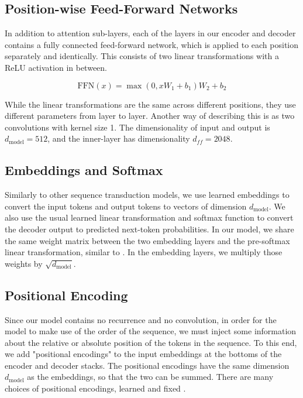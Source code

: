 \documentclass{article}
\newcommand{\dmodel}{d_{\text{model}}}
\begin{document}
\subsection{Position-wise Feed-Forward Networks}\label{sec:ffn}

In addition to attention sub-layers, each of the layers in our encoder and decoder contains a fully connected feed-forward network, which is applied to each position separately and identically.  This consists of two linear transformations with a ReLU activation in between.

\begin{equation}
   \mathrm{FFN}(x)=\max(0, xW_1 + b_1) W_2 + b_2
\end{equation}

While the linear transformations are the same across different positions, they use different parameters from layer to layer. Another way of describing this is as two convolutions with kernel size 1.  The dimensionality of input and output is $\dmodel=512$, and the inner-layer has dimensionality $d_{ff}=2048$.












\subsection{Embeddings and Softmax}
Similarly to other sequence transduction models, we use learned embeddings to convert the input tokens and output tokens to vectors of dimension $\dmodel$.  We also use the usual learned linear transformation and softmax function to convert the decoder output to predicted next-token probabilities.  In our model, we share the same weight matrix between the two embedding layers and the pre-softmax linear transformation, similar to \citep{press2016using}.   In the embedding layers, we multiply those weights by $\sqrt{\dmodel}$.


\subsection{Positional Encoding}
Since our model contains no recurrence and no convolution, in order for the model to make use of the order of the sequence, we must inject some information about the relative or absolute position of the tokens in the sequence.  To this end, we add "positional encodings" to the input embeddings at the bottoms of the encoder and decoder stacks.  The positional encodings have the same dimension $\dmodel$ as the embeddings, so that the two can be summed.   There are many choices of positional encodings, learned and fixed \citep{JonasFaceNet2017}.
\end{document}
